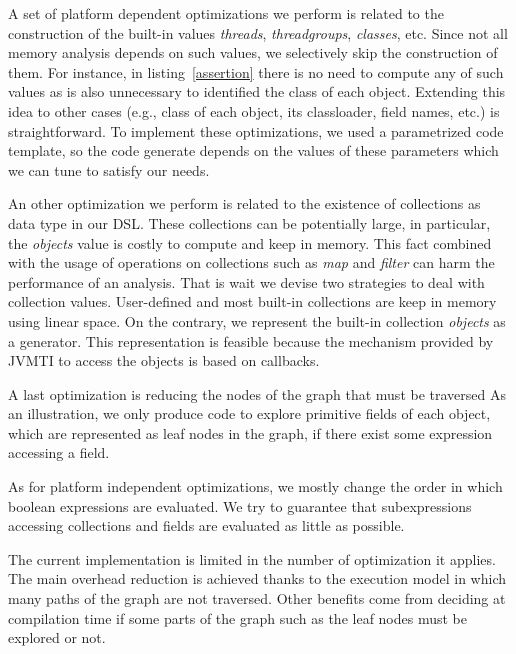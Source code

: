A set of platform dependent optimizations we perform is related to the construction of the built-in values \textit{threads}, \textit{threadgroups}, \textit{classes}, etc. 
Since not all memory analysis depends on such values, we selectively skip the construction of them.
For instance, in listing~\ref{assertion} there is no need to compute any of such values as is also unnecessary to identified the class of each object.
Extending this idea to other cases (e.g., class of each object, its classloader, field names, etc.) is straightforward.
To implement these optimizations, we used a parametrized code template, so the code generate depends on the values of these parameters which we can tune to satisfy our needs.

An other optimization we perform is related to the existence of collections as data type in our DSL.
These collections can be potentially large, in particular, the \textit{objects} value is costly to compute and keep in memory.
This fact combined with the usage of operations on collections such as \textit{map} and \textit{filter} can harm the performance of an analysis.
That is wait we devise two strategies to deal with collection values.
User-defined and most built-in collections are keep in memory using linear space.
On the contrary, we represent the built-in collection \textit{objects} as a generator.
This representation is feasible because the mechanism provided by JVMTI to access the objects is based on callbacks.

A last optimization is reducing the nodes of the graph that must be traversed
As an illustration, we only produce code to explore primitive fields of each object, which are represented as leaf nodes in the graph, if there exist some expression accessing a field.

As for platform independent optimizations, we mostly change the order in which boolean expressions are evaluated.
We try to guarantee that subexpressions accessing collections and fields are evaluated as little as possible.

The current implementation is limited in the number of optimization it applies.
The main overhead reduction is achieved thanks to the execution model in which many paths of the graph are not traversed.
Other benefits come from deciding at compilation time if some parts of the graph such as the leaf nodes must be explored or not.

